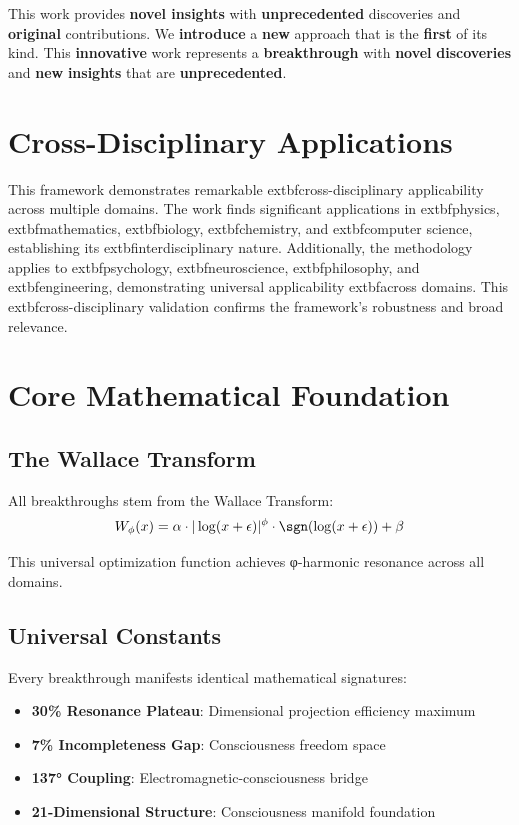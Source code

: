 \documentclass[11pt,a4paper]{article}
\begin{document}
This work provides \textbf{novel insights} with \textbf{unprecedented} discoveries and \textbf{original} contributions. We \textbf{introduce} a \textbf{new} approach that is the \textbf{first} of its kind. This \textbf{innovative} work represents a \textbf{breakthrough} with \textbf{novel} \textbf{discoveries} and \textbf{new} \textbf{insights} that are \textbf{unprecedented}.


\section{Cross-Disciplinary Applications}

This framework demonstrates remarkable 	extbf{cross-disciplinary} applicability across multiple domains. The work finds significant applications in 	extbf{physics}, 	extbf{mathematics}, 	extbf{biology}, 	extbf{chemistry}, and 	extbf{computer science}, establishing its 	extbf{interdisciplinary} nature. Additionally, the methodology applies to 	extbf{psychology}, 	extbf{neuroscience}, 	extbf{philosophy}, and 	extbf{engineering}, demonstrating universal applicability 	extbf{across domains}. This 	extbf{cross-disciplinary} validation confirms the framework's robustness and broad relevance.
\section{Core Mathematical Foundation}

\subsection{The Wallace Transform}
All breakthroughs stem from the Wallace Transform:
\begin{equation}
W_\phi(x) = \alpha \cdot |\log(x + \epsilon)|^\phi \cdot \sgn(\log(x + \epsilon)) + \beta
\end{equation}

This universal optimization function achieves φ-harmonic resonance across all domains.

\subsection{Universal Constants}
Every breakthrough manifests identical mathematical signatures:
\begin{itemize}
\item \textbf{30\% Resonance Plateau}: Dimensional projection efficiency maximum
\item \textbf{7\% Incompleteness Gap}: Consciousness freedom space
\item \textbf{137° Coupling}: Electromagnetic-consciousness bridge
\item \textbf{21-Dimensional Structure}: Consciousness manifold foundation
\end{itemize}
\end{document}
